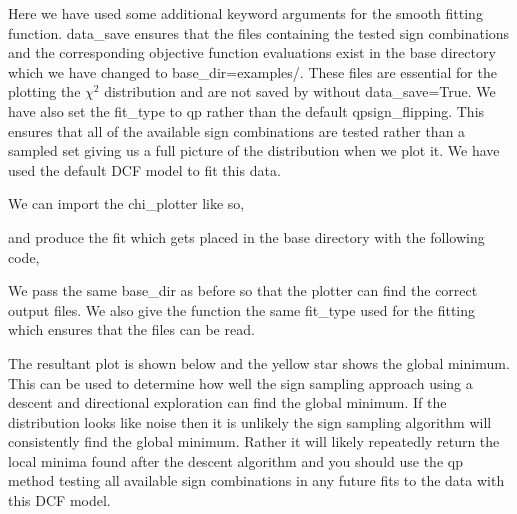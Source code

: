 \documentclass[letterpaper,10pt,english]{sphinxmanual}
\begin{document}
Here we have used some additional keyword arguments for the \textquotesingle{}smooth\textquotesingle{} fitting
function. \textquotesingle{}data\_save\textquotesingle{} ensures that the files containing the tested sign combinations
and the corresponding objective function evaluations exist in the base directory
which we have changed to \textquotesingle{}base\_dir=\textquotesingle{}examples/\textquotesingle{}\textquotesingle{}. These files are essential for
the plotting the \({\chi^2}\) distribution and are not saved by 
without \textquotesingle{}data\_save=True\textquotesingle{}. We have also set the \textquotesingle{}fit\_type\textquotesingle{} to \textquotesingle{}qp\textquotesingle{} rather than the
default \textquotesingle{}qp\sphinxhyphen{}sign\_flipping\textquotesingle{}. This ensures that all of the available sign
combinations are tested rather than a sampled set giving us a full picture of the
distribution when we plot it. We have used the default DCF model to fit this data.

We can import the \textquotesingle{}chi\_plotter\textquotesingle{} like so,

\begin{sphinxVerbatim}[commandchars=\\\{\}]
   
\end{sphinxVerbatim}

and produce the fit which gets placed in the base directory with the following
code,

\begin{sphinxVerbatim}[commandchars=\\\{\}]
  
\end{sphinxVerbatim}

We pass the same \textquotesingle{}base\_dir\textquotesingle{} as before so that the plotter can find the correct output
files. We also give the function the same \textquotesingle{}fit\_type\textquotesingle{} used for the fitting which
ensures that the files can be read.

The resultant plot is shown below and the yellow star shows the global minimum.
This can be used to determine how well
the sign sampling approach using a descent and directional exploration
can find the global minimum. If the distribution looks like noise then it is
unlikely the sign sampling algorithm will consistently find the global minimum.
Rather it will likely repeatedly return the local minima found after the descent
algorithm and you should use the \textquotesingle{}qp\textquotesingle{} method testing all available sign combinations
in any future fits to the data with this DCF model.
\end{document}

